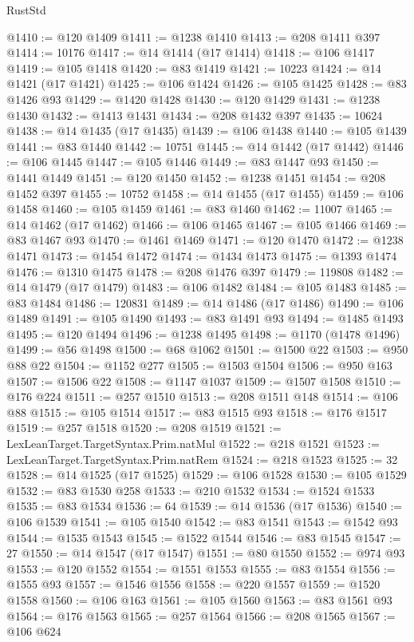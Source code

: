 \begin{lexlean}{RustStd}
\begin{coremodule}
@1410 := @120 @1409
@1411 := @1238 @1410
@1413 := @208 @1411 @397
@1414 := 10176
@1417 := @14 @1414 (@17 @1414)
@1418 := @106 @1417
@1419 := @105 @1418
@1420 := @83 @1419
@1421 := 10223
@1424 := @14 @1421 (@17 @1421)
@1425 := @106 @1424
@1426 := @105 @1425
@1428 := @83 @1426 @93
@1429 := @1420 @1428
@1430 := @120 @1429
@1431 := @1238 @1430
@1432 := @1413 @1431
@1434 := @208 @1432 @397
@1435 := 10624
@1438 := @14 @1435 (@17 @1435)
@1439 := @106 @1438
@1440 := @105 @1439
@1441 := @83 @1440
@1442 := 10751
@1445 := @14 @1442 (@17 @1442)
@1446 := @106 @1445
@1447 := @105 @1446
@1449 := @83 @1447 @93
@1450 := @1441 @1449
@1451 := @120 @1450
@1452 := @1238 @1451
@1454 := @208 @1452 @397
@1455 := 10752
@1458 := @14 @1455 (@17 @1455)
@1459 := @106 @1458
@1460 := @105 @1459
@1461 := @83 @1460
@1462 := 11007
@1465 := @14 @1462 (@17 @1462)
@1466 := @106 @1465
@1467 := @105 @1466
@1469 := @83 @1467 @93
@1470 := @1461 @1469
@1471 := @120 @1470
@1472 := @1238 @1471
@1473 := @1454 @1472
@1474 := @1434 @1473
@1475 := @1393 @1474
@1476 := @1310 @1475
@1478 := @208 @1476 @397
@1479 := 119808
@1482 := @14 @1479 (@17 @1479)
@1483 := @106 @1482
@1484 := @105 @1483
@1485 := @83 @1484
@1486 := 120831
@1489 := @14 @1486 (@17 @1486)
@1490 := @106 @1489
@1491 := @105 @1490
@1493 := @83 @1491 @93
@1494 := @1485 @1493
@1495 := @120 @1494
@1496 := @1238 @1495
@1498 := @1170 (@1478 @1496)
@1499 := @56 @1498
@1500 := @68 @1062
@1501 := @1500 @22
@1503 := @950 @88 @22
@1504 := @1152 @277
@1505 := @1503 @1504
@1506 := @950 @163
@1507 := @1506 @22
@1508 := @1147 @1037
@1509 := @1507 @1508
@1510 := @176 @224
@1511 := @257 @1510
@1513 := @208 @1511 @148
@1514 := @106 @88
@1515 := @105 @1514
@1517 := @83 @1515 @93
@1518 := @176 @1517
@1519 := @257 @1518
@1520 := @208 @1519
@1521 := LexLeanTarget.TargetSyntax.Prim.natMul
@1522 := @218 @1521
@1523 := LexLeanTarget.TargetSyntax.Prim.natRem
@1524 := @218 @1523
@1525 := 32
@1528 := @14 @1525 (@17 @1525)
@1529 := @106 @1528
@1530 := @105 @1529
@1532 := @83 @1530 @258
@1533 := @210 @1532
@1534 := @1524 @1533
@1535 := @83 @1534
@1536 := 64
@1539 := @14 @1536 (@17 @1536)
@1540 := @106 @1539
@1541 := @105 @1540
@1542 := @83 @1541
@1543 := @1542 @93
@1544 := @1535 @1543
@1545 := @1522 @1544
@1546 := @83 @1545
@1547 := 27
@1550 := @14 @1547 (@17 @1547)
@1551 := @80 @1550
@1552 := @974 @93
@1553 := @120 @1552
@1554 := @1551 @1553
@1555 := @83 @1554
@1556 := @1555 @93
@1557 := @1546 @1556
@1558 := @220 @1557
@1559 := @1520 @1558
@1560 := @106 @163
@1561 := @105 @1560
@1563 := @83 @1561 @93
@1564 := @176 @1563
@1565 := @257 @1564
@1566 := @208 @1565
@1567 := @106 @624

\end{coremodule}
\end{lexlean}
